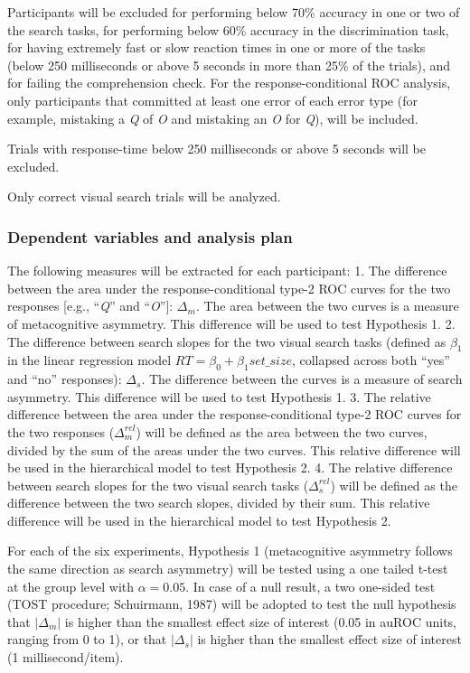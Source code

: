 \documentclass[
  english,
  man,floatsintext]{apa6}
\begin{document}
Participants will be excluded for performing below 70\% accuracy in one or two of the search tasks, for performing below 60\% accuracy in the discrimination task, for having extremely fast or slow reaction times in one or more of the tasks (below 250 milliseconds or above 5 seconds in more than 25\% of the trials), and for failing the comprehension check. For the response-conditional ROC analysis, only participants that committed at least one error of each error type (for example, mistaking a \emph{Q} of \emph{O} and mistaking an \emph{O} for \emph{Q}), will be included.

Trials with response-time below 250 milliseconds or above 5 seconds will be excluded.

Only correct visual search trials will be analyzed.

\hypertarget{dependent-variables-and-analysis-plan}{%
\subsubsection{Dependent variables and analysis plan}\label{dependent-variables-and-analysis-plan}}

The following measures will be extracted for each participant:
1. The difference between the area under the response-conditional type-2 ROC curves for the two responses {[}e.g., \enquote{\emph{Q}} and \enquote{\emph{O}}{]}: \(\Delta_m\). The area between the two curves is a measure of metacognitive asymmetry. This difference will be used to test Hypothesis 1.
2. The difference between search slopes for the two visual search tasks (defined as \(\beta_1\) in the linear regression model \(RT=\beta_0+\beta_1set\_size\), collapsed across both \enquote{yes} and \enquote{no} responses): \(\Delta_s\). The difference between the curves is a measure of search asymmetry. This difference will be used to test Hypothesis 1.
3. The relative difference between the area under the response-conditional type-2 ROC curves for the two responses (\(\Delta^{rel}_m\)) will be defined as the area between the two curves, divided by the sum of the areas under the two curves. This relative difference will be used in the hierarchical model to test Hypothesis 2.
4. The relative difference between search slopes for the two visual search tasks (\(\Delta^{rel}_s\)) will be defined as the difference between the two search slopes, divided by their sum. This relative difference will be used in the hierarchical model to test Hypothesis 2.

For each of the six experiments, Hypothesis 1 (metacognitive asymmetry follows the same direction as search asymmetry) will be tested using a one tailed t-test at the group level with \(\alpha=0.05\). In case of a null result, a two one-sided test (TOST procedure; Schuirmann, 1987) will be adopted to test the null hypothesis that \(|\Delta_m|\) is higher than the smallest effect size of interest (0.05 in auROC units, ranging from 0 to 1), or that \(|\Delta_s|\) is higher than the smallest effect size of interest (1 millisecond/item).
\end{document}
